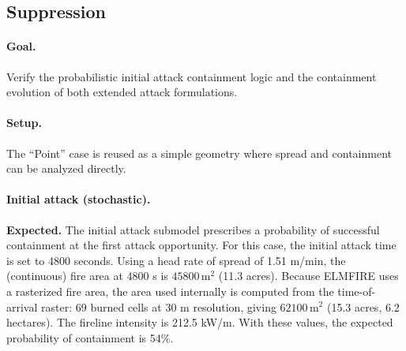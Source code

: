 







\clearpage
\subsection{Suppression}

\paragraph{Goal.} Verify the probabilistic initial attack containment logic and the containment evolution of both extended attack formulations.

\paragraph{Setup.} The ``Point'' case is reused as a simple geometry where spread and containment can be analyzed directly.

\paragraph{Initial attack (stochastic).}
\textbf{Expected.} The initial attack submodel prescribes a probability of successful containment at the first attack opportunity. For this case, the initial attack time is set to 4800 seconds. Using a head rate of spread of 1.51 m/min, the (continuous) fire area at 4800 s is $45800\,\mathrm{m}^2$ (11.3 acres). Because ELMFIRE uses a rasterized fire area, the area used internally is computed from the time-of-arrival raster: 69 burned cells at 30 m resolution, giving $62100\,\mathrm{m}^2$ (15.3 acres, 6.2 hectares). The fireline intensity is 212.5 kW/m. With these values, the expected probability of containment is 54\%.

